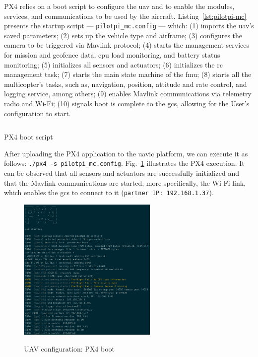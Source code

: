 PX4 relies on a boot script to configure the \gls{uav} and to enable the modules,
services, and communications to be used by the
aircraft. Listing~\ref{lst:pilotpi-mc} presents the startup script --- \texttt{pilotpi\_mc.config} ---
which: (1) imports the \gls{uav}'s saved parameters; (2) sets up the vehicle
type and airframe;  (3) configures the camera to be triggered via Mavlink
protocol; (4) starts the management services for mission and
geofence data, \gls{cpu} load monitoring, and battery status monitoring; (5) initializes all sensors and actuators; (6) initializes the
\gls{rc} management task; (7) starts the main state machine of the \gls{fmu}; 
(8) starts all the multicopter's tasks, such as, navigation, position, attitude
and rate control, and logging service, among others;
(9) enables Mavlink communications via telemetry radio and Wi-Fi; 
(10) signals boot is complete to the \gls{gcs}, allowing for
the User's configuration to start.

\begin{longlisting}
\centering
\inputminted[]{bash}{./listing/pilotpi-mc.config}
\caption{PX4 boot script}
\label{lst:pilotpi-mc}
\end{longlisting}

After uploading the PX4 application to the \gls{uavic} platform, we can execute
it as follows: \lstinline{./px4 -s pilotpi_mc.config}. Fig.~\ref{fig:uav-cfg-px4-boot} illustrates the PX4
execution. It can be observed that all sensors and actuators are successfully
initialized and that the Mavlink communications are started, more specifically,
the Wi-Fi link, which enables the \gls{gcs} to connect to it 
(\lstinline{partner IP: 192.168.1.37}).
  
\begin{figure}[!hbt]
  \centering
  \includegraphics[width=0.6\textwidth]{./img/png/px4-boot} 
  \caption{UAV configuration: PX4 boot}
  \label{fig:uav-cfg-px4-boot}
\end{figure}

